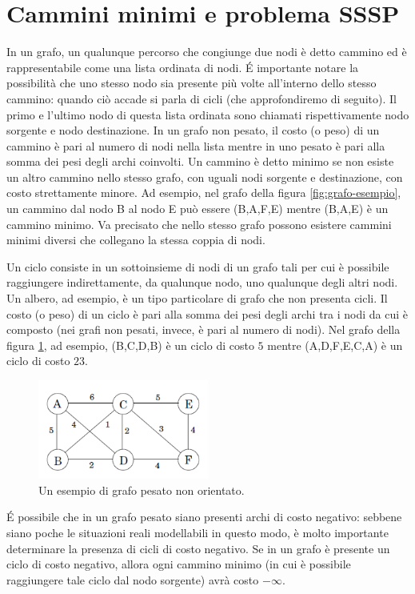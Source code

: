 \documentclass[12pt,a4paper,oneside]{book}
\begin{document}
	\section{Cammini minimi e problema SSSP}
	\label{section:sssp}
	In un grafo, un qualunque percorso che congiunge due nodi è detto cammino ed è rappresentabile come una lista ordinata di nodi. \'E importante notare la possibilità che uno stesso nodo sia presente più volte all'interno dello stesso cammino: quando ciò accade si parla di cicli (che approfondiremo di seguito). Il primo e l'ultimo nodo di questa lista ordinata sono chiamati rispettivamente nodo sorgente e nodo destinazione. In un grafo non pesato, il costo (o peso) di un cammino è pari al numero di nodi nella lista mentre in uno pesato è pari alla somma dei pesi degli archi coinvolti. Un cammino è detto minimo se non esiste un altro cammino nello stesso grafo, con uguali nodi sorgente e destinazione, con costo strettamente minore. Ad esempio, nel grafo della figura \ref{fig:grafo-esempio}, un cammino dal nodo B al nodo E può essere (B,A,F,E) mentre (B,A,E) è un cammino minimo. Va precisato che nello stesso grafo possono esistere cammini minimi diversi che collegano la stessa coppia di nodi.
	
	Un ciclo consiste in un sottoinsieme di nodi di un grafo tali per cui è possibile raggiungere indirettamente, da qualunque nodo, uno qualunque degli altri nodi. Un albero, ad esempio, è un tipo particolare di grafo che non presenta cicli. Il costo (o peso) di un ciclo è pari alla somma dei pesi degli archi tra i nodi da cui è composto (nei grafi non pesati, invece, è pari al numero di nodi). Nel grafo della figura \ref{fig:grafo-esempio-2}, ad esempio, (B,C,D,B) è un ciclo di costo $5$ mentre (A,D,F,E,C,A) è un ciclo di costo $23$.
	\begin{figure}
		\centering
		\includegraphics[width=0.5\textwidth]{grafo-esempio-2}
		\caption{Un esempio di grafo pesato non orientato.}
		\label{fig:grafo-esempio-2}
	\end{figure}
	\'E possibile che in un grafo pesato siano presenti archi di costo negativo: sebbene siano poche le situazioni reali modellabili in questo modo, è molto importante determinare la presenza di cicli di costo negativo. Se in un grafo è presente un ciclo di costo negativo, allora ogni cammino minimo (in cui è possibile raggiungere tale ciclo dal nodo sorgente) avrà costo $-\infty$.
	
\end{document}

